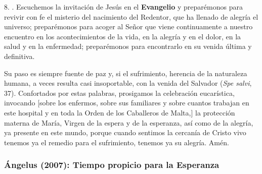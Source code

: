 \begin{body}
	8. . Escuchemos la invitación de Jesús en el \textbf{Evangelio} y preparémonos para revivir con fe el misterio del nacimiento del Redentor, que ha llenado de alegría el universo; preparémonos para acoger al Señor que viene continuamente a nuestro encuentro en los acontecimientos de la vida, en la alegría y en el dolor, en la salud y en la enfermedad; preparémonos para encontrarlo en su venida última y definitiva. 
	
	Su paso es siempre fuente de paz y, si el sufrimiento, herencia de la naturaleza humana, a veces resulta casi insoportable, con la venida del Salvador  (\emph{Spe salvi}, 37). Confortados por estas palabras, prosigamos la celebración eucarística, invocando {[}sobre los enfermos, sobre sus familiares y sobre cuantos trabajan en este hospital y en toda la Orden de los Caballeros de Malta,{]} la protección materna de María, Virgen de la espera y de la esperanza, así como de la alegría, ya presente en este mundo, porque cuando sentimos la cercanía de Cristo vivo tenemos ya el remedio para el sufrimiento, tenemos ya su alegría. Amén.
\end{body}

\newpage
\subsubsection{Ángelus (2007): Tiempo propicio para la Esperanza}


